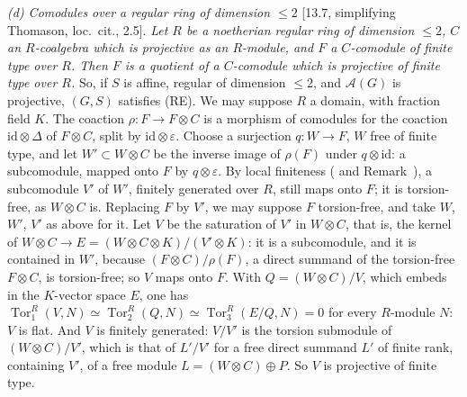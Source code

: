 \par\smallskip\noindent\textit{(d) Comodules over a regular ring of dimension \(\leq2\)}
[13.7, simplifying Thomason, loc.\ cit., 2.5]. \emph{Let \(R\) be a noetherian regular ring of
dimension \(\leq2\), \(C\) an \(R\)-coalgebra which is projective as an \(R\)-module, and \(F\)
a \(C\)-comodule of finite type over \(R\). Then \(F\) is a quotient of a \(C\)-comodule which
is projective of finite type over \(R\).} So, if \(S\) is affine, regular of dimension
\(\leq2\), and \(\mathcal A(G)\) is projective, \((G,S)\) satisfies \textup{(RE)}. We may
suppose \(R\) a domain, with fraction field \(K\). The coaction \(\rho:F\to F\otimes C\) is a
morphism of comodules for the coaction \(\mathrm{id}\otimes\Delta\) of \(F\otimes C\), split by
\(\mathrm{id}\otimes\varepsilon\). Choose a surjection \(q:W\to F\), \(W\) free of finite type,
and let \(W'\subset W\otimes C\) be the inverse image of \(\rho(F)\) under
\(q\otimes\mathrm{id}\): a subcomodule, mapped onto \(F\) by \(q\otimes\varepsilon\). By local
finiteness ( and
Remark~), a subcomodule \(V'\) of \(W'\), finitely
generated over \(R\), still maps onto \(F\); it is torsion-free, as \(W\otimes C\) is.
Replacing \(F\) by \(V'\), we may suppose \(F\) torsion-free, and take \(W\), \(W'\), \(V'\) as
above for it. Let \(V\) be the saturation of \(V'\) in \(W\otimes C\), that is, the kernel of
\(W\otimes C\to E=(W\otimes C\otimes K)/(V'\otimes K)\): it is a subcomodule, and it is
contained in \(W'\), because \((F\otimes C)/\rho(F)\), a direct summand of the torsion-free
\(F\otimes C\), is torsion-free; so \(V\) maps onto \(F\). With \(Q=(W\otimes C)/V\), which
embeds in the \(K\)-vector space \(E\), one has
\(\operatorname{Tor}^R_1(V,N)\simeq\operatorname{Tor}^R_2(Q,N)\simeq\operatorname{Tor}^R_3(E/Q,N)=0\)
for every \(R\)-module \(N\): \(V\) is flat. And \(V\) is finitely generated: \(V/V'\) is the
torsion submodule of \((W\otimes C)/V'\), which is that of \(L'/V'\) for a free direct summand
\(L'\) of finite rank, containing \(V'\), of a free module \(L=(W\otimes C)\oplus P\). So \(V\)
is projective of finite type.



